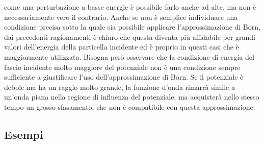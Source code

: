 \documentclass[a4paper,fleqn,twoside,12pt]{article}
\begin{document}
come una perturbazione a basse energie è possibile farlo anche ad alte, ma non è
necessariamente vero il contrario.  Anche se non è semplice individuare una
condizione precisa sotto la quale sia possibile applicare l'approssimazione di
Born, dai precedenti ragionamenti è chiaro che questa diventa più affidabile per
grandi valori dell'energia della particella incidente ed è proprio in questi
casi che è maggiormente utilizzata.  Bisogna però osservare che la condizione di
energia del fascio incidente molto maggiore del potenziale non è una condizione
sempre sufficiente a giustificare l'uso dell'approssimazione di Born.  Se il
potenziale è debole ma ha un raggio molto grande, la funzione d'onda rimarrà
simile a un'onda piana nella regione di influenza del potenziale, ma acquisterà
nello stesso tempo un grosso sfasamento, che non è compatibile con questa
approssimazione.

\subsection{Esempi}
\label{sec:esempi-born}
\end{document}
